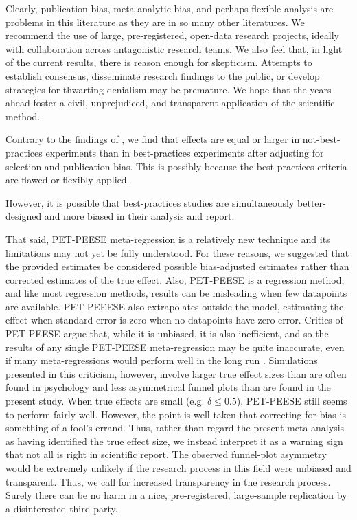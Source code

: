 \documentclass[man]{apa6}
\begin{document}
Clearly, publication bias, meta-analytic bias, and perhaps flexible analysis are problems in this literature as they are in so many other literatures. We recommend the use of large, pre-registered, open-data research projects, ideally with collaboration across antagonistic research teams. We also feel that, in light of the current results, there is reason enough for skepticism. Attempts to establish consensus, disseminate research findings to the public, or develop strategies for thwarting denialism may be premature. We hope that the years ahead foster a civil, unprejudiced, and transparent application of the scientific method. 

Contrary to the findings of \citet{Anderson:etal:2010}, we find that effects are equal or larger in not-best-practices experiments than in best-practices experiments after adjusting for selection and publication bias. This is possibly because the best-practices criteria are flawed or flexibly applied.

However, it is possible that best-practices studies are simultaneously better-designed and more biased in their analysis and report. 

That said, PET-PEESE meta-regression is a relatively new technique and its limitations may not yet be fully understood. For these reasons, we suggested that the provided estimates be considered possible bias-adjusted estimates rather than corrected estimates of the true effect. Also, PET-PEESE is a regression method, and like most regression methods, results can be misleading when few datapoints are available. PET-PEEESE also extrapolates outside the model, estimating the effect when standard error is zero when no datapoints have zero error. 
Critics of PET-PEESE argue that, while it is unbiased, it is also inefficient, and so the results of any single PET-PEESE meta-regression may be quite inaccurate, even if many meta-regressions would perform well in the long run \citep{Reed:etal:WORKINGPAPER}. Simulations presented in this criticism, however, involve larger true effect sizes than are often found in psychology and less asymmetrical funnel plots than are found in the present study. When true effects are small (e.g. $\delta \le 0.5$), PET-PEESE still seems to perform fairly well. However, the point is well taken that correcting for bias is something of a fool's errand.
Thus, rather than regard the present meta-analysis as having identified the true effect size, we instead interpret it as a warning sign that not all is right in scientific report. The observed funnel-plot asymmetry would be extremely unlikely if the research process in this field were unbiased and transparent. Thus, we call for increased transparency in the research process. 
Surely there can be no harm in a nice, pre-registered, large-sample replication by a disinterested third party.
\end{document}
